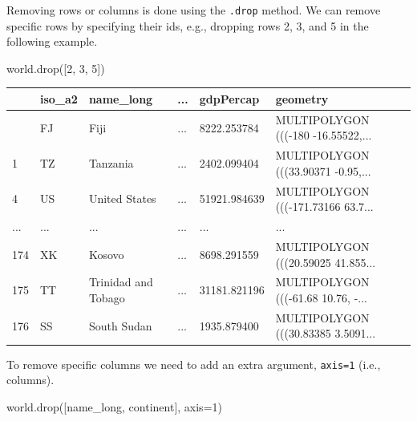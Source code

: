 \documentclass[
  letterpaper,
]{krantz}
\newenvironment{Shaded}{\begin{snugshade}}{\end{snugshade}}
\newcommand{\DecValTok}[1]{\textcolor[rgb]{0.68,0.00,0.00}{#1}}
\newcommand{\NormalTok}[1]{\textcolor[rgb]{0.00,0.23,0.31}{#1}}
\newcommand{\OperatorTok}[1]{\textcolor[rgb]{0.37,0.37,0.37}{#1}}
\newcommand{\StringTok}[1]{\textcolor[rgb]{0.13,0.47,0.30}{#1}}
\begin{document}
Removing rows or columns is done using the \texttt{.drop} method. We can
remove specific rows by specifying their ids, e.g., dropping rows 2, 3,
and 5 in the following example.

\begin{Shaded}
\begin{Highlighting}[]
\NormalTok{world.drop([}\DecValTok{2}\NormalTok{, }\DecValTok{3}\NormalTok{, }\DecValTok{5}\NormalTok{])}
\end{Highlighting}
\end{Shaded}

\begin{longtable}[]{@{}llllll@{}}
\toprule\noalign{}
& iso\_a2 & name\_long & ... & gdpPercap & geometry \\
\midrule\noalign{}
\endhead
\bottomrule\noalign{}
\endlastfoot
0 & FJ & Fiji & ... & 8222.253784 & MULTIPOLYGON (((-180
-16.55522,... \\
1 & TZ & Tanzania & ... & 2402.099404 & MULTIPOLYGON (((33.90371
-0.95,... \\
4 & US & United States & ... & 51921.984639 & MULTIPOLYGON (((-171.73166
63.7... \\
... & ... & ... & ... & ... & ... \\
174 & XK & Kosovo & ... & 8698.291559 & MULTIPOLYGON (((20.59025
41.855... \\
175 & TT & Trinidad and Tobago & ... & 31181.821196 & MULTIPOLYGON
(((-61.68 10.76, -... \\
176 & SS & South Sudan & ... & 1935.879400 & MULTIPOLYGON (((30.83385
3.5091... \\
\end{longtable}

To remove specific columns we need to add an extra argument,
\texttt{axis=1} (i.e., columns).

\begin{Shaded}
\begin{Highlighting}[]
\NormalTok{world.drop([}\StringTok{\textquotesingle{}name\_long\textquotesingle{}}\NormalTok{, }\StringTok{\textquotesingle{}continent\textquotesingle{}}\NormalTok{], axis}\OperatorTok{=}\DecValTok{1}\NormalTok{)}
\end{Highlighting}
\end{Shaded}
\end{document}
